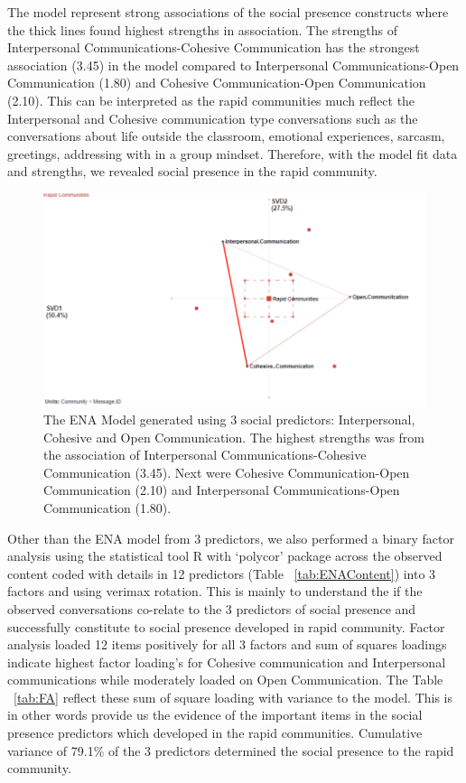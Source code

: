 \documentclass[manuscript,screen,review]{acmart}
\begin{document}
The model represent strong associations of the social presence constructs where the thick lines found highest strengths in association. The strengths of Interpersonal Communications-Cohesive Communication has the strongest association (3.45) in the model compared to Interpersonal Communications-Open Communication (1.80) and Cohesive Communication-Open Communication (2.10). This can be interpreted as the rapid communities much reflect the Interpersonal and Cohesive communication type conversations such as the conversations about life outside the classroom, emotional experiences, sarcasm, greetings, addressing with in a group mindset. Therefore, with the model fit data and strengths, we revealed social presence in the rapid community. 
\begin{figure}[h]
  \centering
  \includegraphics[width=\linewidth]{images/ENASocialP.png}
  \caption{The ENA Model generated using 3 social predictors: Interpersonal, Cohesive and Open Communication. The highest  strengths was from the association of Interpersonal Communications-Cohesive Communication (3.45). Next were Cohesive Communication-Open Communication (2.10) and Interpersonal Communications-Open Communication (1.80).   }
 \label{fig:primary}
\end{figure}

Other than the ENA model from 3 predictors, we also performed a binary factor analysis using the statistical tool R with ‘polycor’ package across the observed content coded with details in 12 predictors (Table ~\ref{tab:ENAContent}) into 3 factors and using verimax rotation. This is mainly to understand the if the observed conversations co-relate to the 3 predictors of social presence and successfully constitute to social presence developed in rapid community. Factor analysis loaded 12 items positively for all 3 factors and sum of squares loadings indicate highest factor loading's for Cohesive communication and Interpersonal communications while moderately loaded on Open Communication. The Table ~\ref{tab:FA} reflect these sum of square loading with variance to the model. This is in other words provide us the evidence of the important items in the social presence predictors which developed in the rapid communities. Cumulative variance of 79.1\% of the 3 predictors determined the social presence to the rapid community. 
\end{document}
